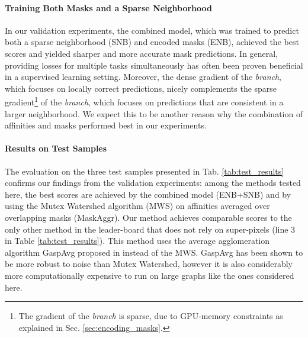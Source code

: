 \paragraph{Training Both Masks and a Sparse Neighborhood} In our validation experiments, the combined model, which was trained to predict both a sparse neighborhood (SNB) and encoded \maskname masks (ENB), achieved the best scores and yielded sharper and more accurate mask predictions.
In general, providing losses for multiple tasks simultaneously has often been proven beneficial in a supervised learning setting.
Moreover, the dense gradient of the \emph{\encBr branch}, which focuses on locally correct predictions, nicely complements the sparse gradient\footnote{The gradient of the \emph{\encBr branch} is sparse, due to GPU-memory constraints as explained in Sec. \ref{sec:encoding_masks}.} of the \emph{\encBr branch}, which focuses on predictions that are consistent in a larger neighborhood. We expect this to be another reason why the combination of affinities and \maskname masks performed best in our experiments. 





\paragraph{Results on Test Samples} The evaluation on the three test samples presented in Tab. \ref{tab:test_results} confirms our findings from the validation experiments: among the methods tested here, the best scores are achieved by the combined model (ENB+SNB) and by using the Mutex Watershed algorithm (MWS) on affinities averaged over overlapping masks (MaskAggr).
Our method achieves comparable scores to the only other method in the leader-board that does not rely on super-pixels (line 3 in Table \ref{tab:test_results}). This method uses the average agglomeration algorithm GaspAvg proposed in \cite{bailoni2019generalized} instead of the MWS. GaspAvg has been shown to be more robust to noise than Mutex Watershed, however it is also considerably more computationally expensive to run on large graphs like the ones considered here. 

